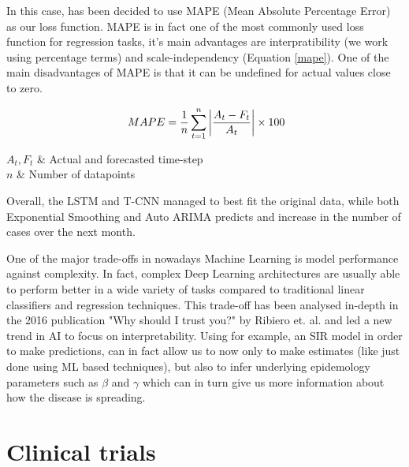 In this case, has been decided to use MAPE (Mean Absolute Percentage Error) as our loss function. 
MAPE is in fact one of the most commonly used loss function for regression tasks, it's main advantages are interpratibility (we work using percentage terms) and scale-independency (Equation \ref{mape}). One of the main disadvantages of MAPE is that it can be undefined for actual values close to zero.

\useshortskip
\begin{align}
\ MAPE = \dfrac{1}{n} \sum_{t=1}^{n} \abs{\frac{A_{t}-F_{t}}{A_{t}}} \times 100
\label{mape}
\end{align}
\vspace{-0.4cm}
\begin{conditions}
 $A_{t}, F_{t}$  &  Actual and forecasted time-step \\
 $n$  &  Number of datapoints\\
\end{conditions}
\vspace{-0.2cm}
\useshortskip

Overall, the LSTM and T-CNN managed to best fit the original data, while both Exponential Smoothing and Auto ARIMA predicts and increase in the number of cases over the next month.

One of the major trade-offs in nowadays Machine Learning is model performance against complexity. In fact, complex Deep Learning architectures are usually able to perform better in a wide variety of tasks compared to traditional linear classifiers and regression techniques. This trade-off has been analysed in-depth in the 2016 publication "Why should I trust you?" by Ribiero et. al. \cite{exp_ai} and led a new trend in AI to focus on interpretability. Using for example, an SIR model in order to make predictions, can in fact allow us to now only to make estimates (like just done using ML based techniques), but also to infer underlying epidemology parameters such as $\beta$ and $\gamma$ which can in turn give us more information about how the disease is spreading.

\vspace{-0.2cm}
\section{Clinical trials}

